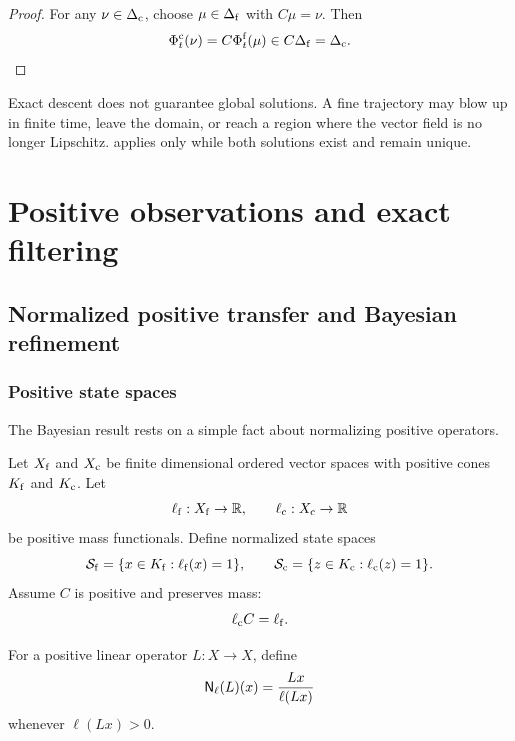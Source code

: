 \begin{proof}
For any $\nu\in\Delta_{\mathrm c}$, choose $\mu\in\Delta_{\mathrm f}$ with $C\mu=\nu$.  Then
\[
  \Phi_t^{\mathrm c}(\nu)
  =C\Phi_t^{\mathrm f}(\mu)
  \in C\Delta_{\mathrm f}
  =\Delta_{\mathrm c}.
\]
\end{proof}

\begin{PRIQboundary}
Exact descent does not guarantee global solutions.  A fine trajectory may blow up in finite time, leave the domain, or reach a region where the vector field is no longer Lipschitz.   applies only while both solutions exist and remain unique.
\end{PRIQboundary}


\chapter{Positive observations and exact filtering}\label{PRIQ:book:chapter-41}
\section{Normalized positive transfer and Bayesian refinement}\label{PRIQ:sec:bayes}

\subsection{Positive state spaces}
The Bayesian result rests on a simple fact about normalizing positive operators.

Let $X_{\mathrm f}$ and $X_{\mathrm c}$ be finite dimensional ordered vector spaces with positive cones $K_{\mathrm f}$ and $K_{\mathrm c}$.  Let
\[
  \ell_{\mathrm f}:X_{\mathrm f}\to\mathbb R,
  \qquad
  \ell_{\mathrm c}:X_{\mathrm c}\to\mathbb R
\]
be positive mass functionals.  Define normalized state spaces
\[
  \mathcal S_{\mathrm f}
  =\{x\in K_{\mathrm f}:\ell_{\mathrm f}(x)=1\},
  \qquad
  \mathcal S_{\mathrm c}
  =\{z\in K_{\mathrm c}:\ell_{\mathrm c}(z)=1\}.
\]
Assume $C$ is positive and preserves mass:
\begin{equation}\label{PRIQ:eq:mass-preserving-C}
  \ell_{\mathrm c}C=\ell_{\mathrm f}.
\end{equation}

\begin{PRIQdefinition}\label{PRIQ:def:normalized-transfer}
For a positive linear operator $L:X\to X$, define
\begin{equation}\label{PRIQ:eq:normalized-transfer}
  \mathsf N_{\ell}(L)(x)
  =
  \frac{Lx}{\ell(Lx)}
\end{equation}
whenever $\ell(Lx)>0$.
\end{PRIQdefinition}

